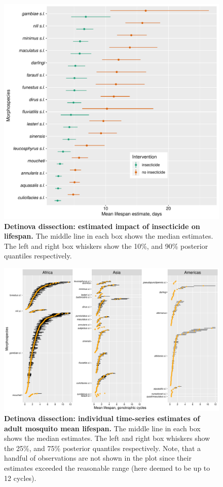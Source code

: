 \documentclass[12pt]{article}
\begin{document}
\begin{figure}[h]
	\centerline{\includegraphics[width=1\textwidth]{./Figure_files/detinova_insecticide.pdf}}
	\caption{\textbf{Detinova dissection: estimated impact of insecticide on lifespan.} The middle line in each box shows the median estimates. The left and right box whiskers show the 10\%, and 90\% posterior quantiles respectively.}
	\label{fig:detinova_insecticide}
\end{figure}

\begin{figure}[h]
	\centerline{\includegraphics[width=1.3\textwidth]{./Figure_files/detinova_individual_lifespan_no_insecticide.pdf}}
	\caption{\textbf{Detinova dissection: individual time-series estimates of adult mosquito mean lifespan.} The middle line in each box shows the median estimates. The left and right box whiskers show the 25\%, and 75\% posterior quantiles respectively. Note, that a handful of observations are not shown in the plot since their estimates exceeded the reasonable range (here deemed to be up to 12 cycles).}
	\label{fig:detinova_lifespan_individual}
\end{figure}
\end{document}
